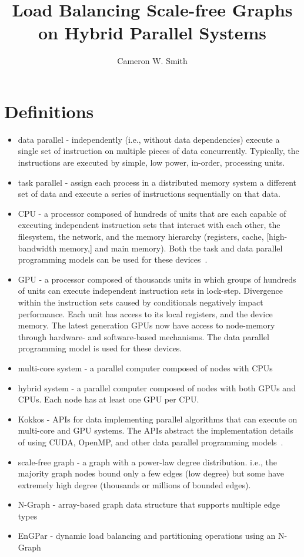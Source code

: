 \documentclass{article}
\title{Load Balancing Scale-free Graphs on Hybrid Parallel Systems}
\author{Cameron W. Smith}
\begin{document}
\maketitle
\section{Definitions}
\begin{itemize}
  \item data parallel - independently (i.e., without data dependencies) execute
    a single set of instruction on multiple pieces of data concurrently.
    Typically, the instructions are executed by simple, low power, in-order,
    processing units.
  \item task parallel - assign each process in a distributed memory system a
    different set of data and execute a series of instructions sequentially on
    that data.
  \item CPU - a processor composed of hundreds of units that are
    each capable of executing independent instruction sets that interact with
    each other, the filesystem, the network, and the memory hierarchy
    (registers, cache, [high-bandwidth memory,] and main memory).
    Both the task and data parallel programming models can be used for these
    devices~\cite{jeffers2016intel}.
  \item GPU - a processor composed of thousands units in which groups of
    hundreds of units can execute independent instruction sets in lock-step.
    Divergence within the instruction sets caused by conditionals negatively
    impact performance.
    Each unit has access to its local registers, and the device memory.
    The latest generation GPUs now have access to node-memory through hardware-
    and software-based mechanisms.
    The data parallel programming model is used for these devices.
  \item multi-core system - a parallel computer composed of nodes with CPUs
  \item hybrid system - a parallel computer composed of nodes with
    both GPUs and CPUs.
    Each node has at least one GPU per CPU.
  \item Kokkos - APIs for data implementing parallel algorithms that can execute on
    multi-core and GPU systems.  The APIs abstract the implementation details of
    using CUDA, OpenMP, and other data parallel programming
    models~\cite{edwards2013kokkos}.
  \item scale-free graph - a graph with a power-law degree distribution. i.e.,
    the majority graph nodes bound only a few edges (low degree) but some have extremely high
    degree (thousands or millions of bounded edges).
  \item N-Graph - array-based graph data structure that supports multiple edge types
  \item EnGPar - dynamic load balancing and partitioning operations using an N-Graph
\end{itemize}
\end{document}
